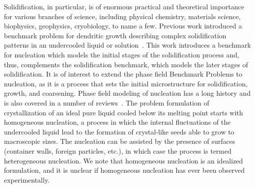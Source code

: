 \documentclass[preprint,12pt]{elsarticle}
\begin{document}
%
Solidification, in particular, is of enormous practical and theoretical importance for various branches of science, including physical chemistry, materials science, biophysics, geophysics, cryobiology, to name a few. Previous work introduced a benchmark problem for dendritic growth describing complex solidification patterns in an undercooled liquid or solution~\cite{jokisaari2017dendrite}. This work introduces a benchmark for nucleation which models the initial stages of the solidification process and, thus, complements the solidification benchmark, which models the later stages of solidification. 
It is of interest to extend the phase field Benchmark Problems to nucleation, as it is a process that sets the initial microstructure for solidification, growth, and coarsening. Phase field modeling of nucleation has a long history and is also covered in a number of reviews~\cite{granasy2002nucleation,castro2003phase,simmons2004microstructural,granasy2007phase,warren2009phase,heo2014phase,granasy2019}. The problem formulation of crystallization of an ideal pure liquid cooled below its melting point starts with homogeneous nucleation, a process in which the internal fluctuations of the undercooled liquid lead to the formation of crystal-like seeds able to grow to macroscopic sizes. The nucleation can be assisted by the presence of surfaces (container walls, foreign particles, etc.), in which case the process is termed heterogeneous nucleation. We note that homogeneous nucleation is an idealized formulation, and it is unclear if homogeneous nucleation has ever been observed experimentally. %
\end{document}
